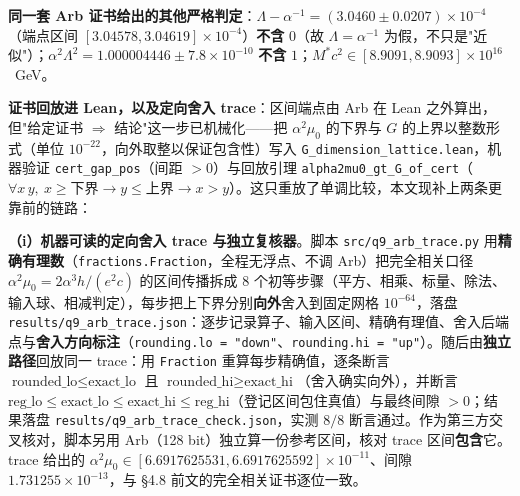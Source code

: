 \documentclass[12pt,a4paper]{article}
\begin{document}
\textbf{同一套 Arb 证书给出的其他严格判定}：$\Lambda - \alpha^{-1} = (3.0460 \pm 0.0207)\times10^{-4}$（端点区间 $[3.04578, 3.04619]\times10^{-4}$）\textbf{不含} $0$（故 $\Lambda = \alpha^{-1}$ 为假，不只是"近似"）；$\alpha^2\Lambda^2 = 1.000004446 \pm 7.8\times10^{-10}$ \textbf{不含} $1$；$M^*c^2 \in [8.9091, 8.9093]\times10^{16}$~GeV。

\textbf{证书回放进 Lean，以及定向舍入 trace}：区间端点由 Arb 在 Lean 之外算出，但"给定证书 $\Rightarrow$ 结论"这一步已机械化——把 $\alpha^2\mu_0$ 的下界与 $G$ 的上界以整数形式（单位 $10^{-22}$，向外取整以保证包含性）写入 \texttt{G\_\allowbreak{}dimension\_\allowbreak{}lattice.lean}，机器验证 \texttt{cert\_\allowbreak{}gap\_\allowbreak{}pos}（间距 $>0$）与回放引理 \texttt{alpha2mu0\_\allowbreak{}gt\_\allowbreak{}G\_\allowbreak{}of\_\allowbreak{}cert}（$\forall x\,y,\ x \ge \text{下界} \to y \le \text{上界} \to x > y$）。这只重放了单调比较，本文现补上两条更靠前的链路：

\textbf{（i）机器可读的定向舍入 trace 与独立复核器}。脚本 \texttt{src/q9\_\allowbreak{}arb\_\allowbreak{}trace.py} 用\textbf{精确有理数}（\texttt{fractions.Fraction}，全程无浮点、不调 Arb）把完全相关口径 $\alpha^2\mu_0 = 2\alpha^3 h/(e^2c)$ 的区间传播拆成 $8$ 个初等步骤（平方、相乘、标量、除法、输入球、相减判定），每步把上下界分别\textbf{向外}舍入到固定网格 $10^{-64}$，落盘 \texttt{results/q9\_\allowbreak{}arb\_\allowbreak{}trace.json}：逐步记录算子、输入区间、精确有理值、舍入后端点与\textbf{舍入方向标注}（\texttt{rounding.lo = "down"}、\texttt{rounding.hi = "up"}）。随后由\textbf{独立路径}回放同一 trace：用 \texttt{Fraction} 重算每步精确值，逐条断言 $\text{rounded\_lo} \le \text{exact\_lo}$ 且 $\text{rounded\_hi} \ge \text{exact\_hi}$（舍入确实向外），并断言 $\text{reg\_lo} \le \text{exact\_lo} \le \text{exact\_hi} \le \text{reg\_hi}$（登记区间包住真值）与最终间隙 $>0$；结果落盘 \texttt{results/q9\_\allowbreak{}arb\_\allowbreak{}trace\_\allowbreak{}check.json}，实测 $8/8$ 断言通过。作为第三方交叉核对，脚本另用 Arb（128 bit）独立算一份参考区间，核对 trace 区间\textbf{包含}它。trace 给出的 $\alpha^2\mu_0 \in [6.6917625531, 6.6917625592]\times10^{-11}$、间隙 $1.731255\times10^{-13}$，与 §4.8 前文的完全相关证书逐位一致。
\end{document}
